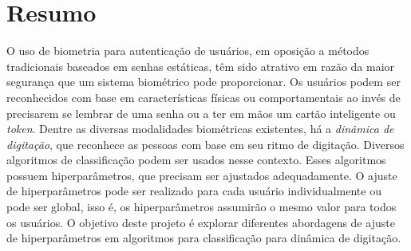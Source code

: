 \section*{Resumo}

O uso de biometria para autenticação de usuários, em oposição a métodos tradicionais baseados em senhas estáticas, têm sido atrativo em razão da maior segurança que um sistema biométrico pode proporcionar. Os usuários podem ser reconhecidos com base em características físicas ou comportamentais ao invés de precisarem se lembrar de uma senha ou a ter em mãos um cartão inteligente ou \textit{token}. Dentre as diversas modalidades biométricas existentes, há a \textit{dinâmica de digitação}, que reconhece as pessoas com base em seu ritmo de digitação. Diversos algoritmos de classificação podem ser usados nesse contexto. Esses algoritmos possuem hiperparâmetros, que precisam ser ajustados adequadamente. O ajuste de hiperparâmetros pode ser realizado para cada usuário individualmente ou pode ser global, isso é, os hiperparâmetros assumirão o mesmo valor para todos os usuários. O objetivo deste projeto é explorar diferentes abordagens de ajuste de hiperparâmetros em algoritmos para classificação para dinâmica de digitação.